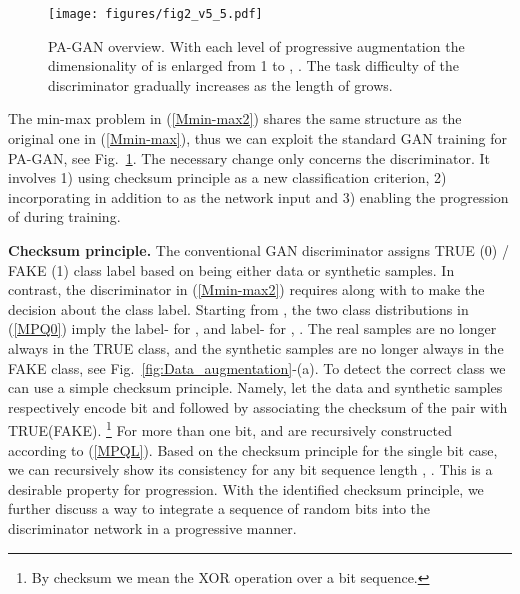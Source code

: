 \documentclass{article}
\begin{document}
\begin{figure}
	\vspace{-1em}
	\begin{center}
		\texttt{[image: figures/fig2\_v5\_5.pdf]}
	\end{center}
	\vspace{-0.5em}
	\caption{\label{fig:approach} PA-GAN overview. With each level of progressive augmentation  the dimensionality of  is enlarged from 1 to , . The task difficulty of the discriminator gradually increases as the length of  grows.}
	\vspace{-1em}
\end{figure}
The min-max problem in (\ref{Mmin-max2}) shares the same structure as the original one in (\ref{Mmin-max}), thus we can exploit the standard GAN training for PA-GAN, see Fig.~\ref{fig:approach}. The necessary change only concerns the discriminator. It involves 1) using checksum principle as a new classification criterion, 2) incorporating  in addition to  as the network input and 3) enabling the progression of  during training.


\textbf{Checksum principle.}
The conventional GAN discriminator assigns TRUE (0) / FAKE (1) class label based on  being either data or synthetic samples. In contrast, the discriminator  in (\ref{Mmin-max2}) requires  along with  to make the decision about the class label. Starting from , the two class distributions in (\ref{MPQ0}) imply the label- for ,  and label- for , . The real samples are no longer always in the TRUE class, and the synthetic samples are no longer always in the FAKE class, see Fig.~\ref{fig:Data_augmentation}-(a). To detect the correct class we can use a simple checksum principle.
Namely, let the data and synthetic samples respectively encode bit  and  followed by associating the checksum  of the pair  with TRUE(FAKE). \footnote{By checksum we mean the XOR operation over a bit sequence.} For more than one bit,  and  are recursively constructed according to (\ref{MPQL}). Based on the checksum principle for the single bit case, we can recursively show its consistency for any bit sequence length , . This is a desirable property for progression. With the identified checksum principle, we further discuss a way to integrate a sequence of random bits  into the discriminator network in a progressive manner.
\end{document}
